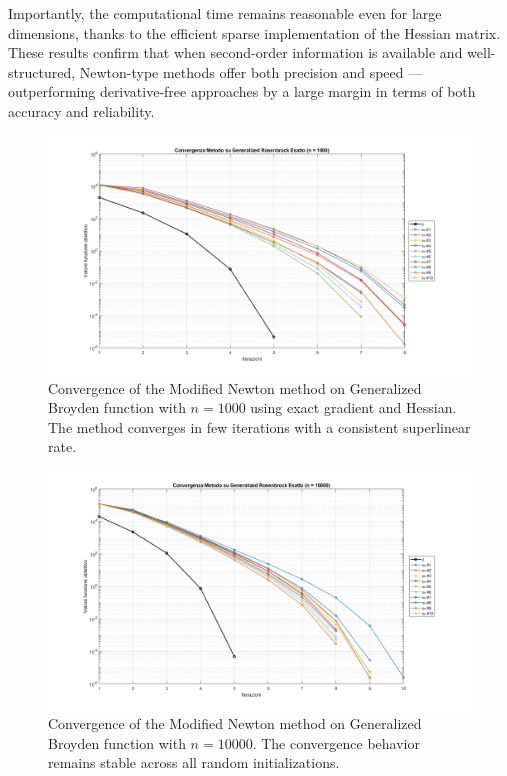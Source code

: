\documentclass[a4paper,12pt]{article}
\begin{document}
	Importantly, the computational time remains reasonable even for large dimensions, thanks to the efficient sparse implementation of the Hessian matrix. These results confirm that when second-order information is available and well-structured, Newton-type methods offer both precision and speed — outperforming derivative-free approaches by a large margin in terms of both accuracy and reliability.
	\newpage
	\begin{figure}[htbp]
		\centering
		\includegraphics[width=\textwidth]{../immagini/broyden_1k.png}
		\caption{Convergence of the Modified Newton method on Generalized Broyden function with $n=1000$ using exact gradient and Hessian. The method converges in few iterations with a consistent superlinear rate.}
		\label{fig:gb_1k_exact}
	\end{figure}
	\newpage
	\begin{figure}[htbp]
		\centering
		\includegraphics[width=\textwidth]{../immagini/broyden_10k.png}
		\caption{Convergence of the Modified Newton method on Generalized Broyden function with $n=10000$. The convergence behavior remains stable across all random initializations.}
		\label{fig:gb_10k_exact}
	\end{figure}
\end{document}
